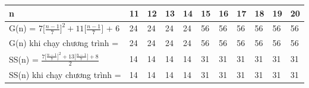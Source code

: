 \documentclass[10pt,a4paper]{article}
\begin{document}
    \begin{table}[H]
        \centering
        \begin{tabular} [c]{|p{5cm}|p{0.75cm}|p{0.75cm}|p{0.75cm}|p{0.75cm}|p{0.75cm}|p{0.75cm}|p{0.75cm}|p{0.75cm}|p{0.75cm}|p{0.75cm}|}
        \hline
        \rowcolor[rgb]{0, .60, .800}
        n & 11 & 12 & 13 & 14 & 15 & 16 & 17 & 18 & 19 & 20 \\
        \hline
        G(n) = $7\big[\frac{n-1}{7}\big]^2 + 11\big[\frac{n-1}{7}\big]$ + 6 & 24 & 24 & 24 & 24 & 56 & 56 & 56 & 56 & 56 & 56  \\
        \hline
        \rowcolor[rgb]{0, .60, .800}
        G(n) khi chạy chương trình = & 24 & 24 & 24 & 24 & 56 & 56 & 56 & 56 & 56 & 56 \\
        \hline 
        SS(n) = $\frac{7\big[\frac{n-1}{7}\big]^2 + 13\big[\frac{n-1}{7}\big]+8}{2}$ & 14 & 14 & 14 & 14 & 31 & 31 & 31 & 31 & 31 & 31 \\
        \hline
        \rowcolor[rgb]{0, .60, .800}
        SS(n) khi chạy chương trình = & 14 & 14 & 14 & 14 & 31 & 31 & 31 & 31 & 31 & 31 \\
        \hline
    \end{tabular}
    \end{table}
\end{document}
